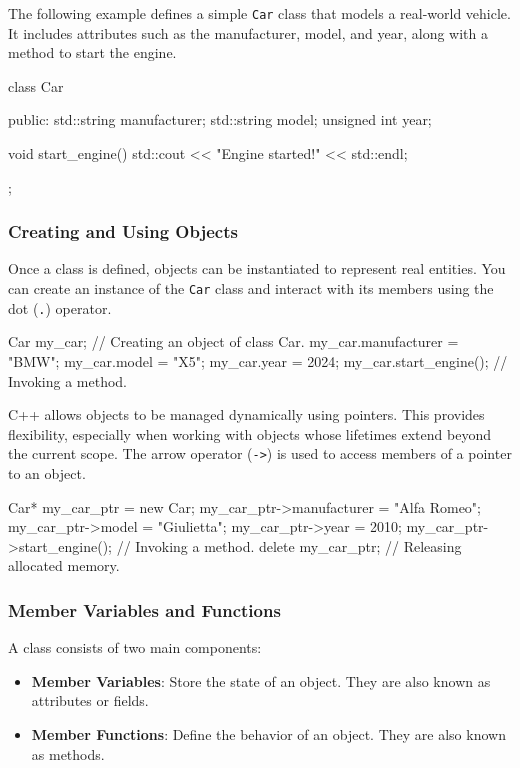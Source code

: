 The following example defines a simple \texttt{Car} class that models a real-world vehicle. It includes attributes such as the manufacturer, model, and year, along with a method to start the engine.
\begin{codeblock}[language=C++]
class Car {
public:
    std::string manufacturer;
    std::string model;
    unsigned int year;

    void start_engine() {
        std::cout << "Engine started!" << std::endl;
    }
};
\end{codeblock}

\subsubsection{Creating and Using Objects}

Once a class is defined, objects can be instantiated to represent real entities. You can create an instance of the \texttt{Car} class and interact with its members using the dot (\texttt{.}) operator.

\begin{codeblock}[language=C++, firstnumber=11]
Car my_car;                     // Creating an object of class Car.
my_car.manufacturer = "BMW";
my_car.model = "X5";
my_car.year = 2024;
my_car.start_engine();          // Invoking a method.
\end{codeblock}

C++ allows objects to be managed dynamically using pointers. This provides flexibility, especially when working with objects whose lifetimes extend beyond the current scope. The arrow operator (\texttt{->}) is used to access members of a pointer to an object.

\begin{codeblock}[language=C++, firstnumber=16]
Car* my_car_ptr = new Car{};
my_car_ptr->manufacturer = "Alfa Romeo";
my_car_ptr->model = "Giulietta";
my_car_ptr->year = 2010;
my_car_ptr->start_engine();     // Invoking a method.
delete my_car_ptr;              // Releasing allocated memory.
\end{codeblock}

\subsubsection{Member Variables and Functions}

A class consists of two main components:

\begin{itemize}
    \item \textbf{Member Variables}: Store the state of an object. They are also known as attributes or fields.
    \item \textbf{Member Functions}: Define the behavior of an object. They are also known as methods.
\end{itemize}

